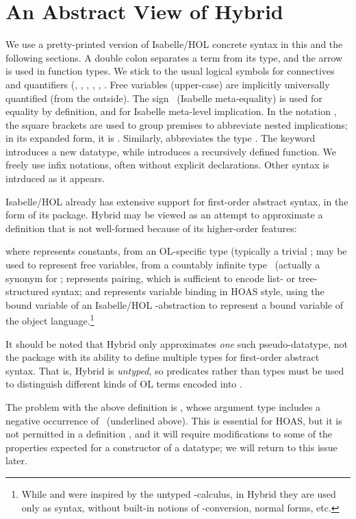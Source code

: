 \documentclass[copyright,creativecommons]{eptcs}
\begin{document}
\section{An Abstract View of Hybrid}
\label{sec:hybrid-overview}

We use a pretty-printed version of Isabelle\slash HOL concrete syntax
in this and the following sections.
A double colon  separates a term from its type, and the arrow
 is used in function types.
We stick to the usual logical symbols for connectives and quantifiers
(, , , , , .
Free variables (upper-case) are implicitly universally quantified
(from the outside).
The sign \ (Isabelle meta-equality) is used for equality by
definition, and  for Isabelle meta-level implication.
In the notation , the square
brackets are used to group premises to abbreviate nested implications;
in its expanded form, it is .
Similarly,  abbreviates the type
.
The keyword  introduces a new datatype, while
 introduces a recursively defined function.
We freely use infix notations, often without explicit declarations.
Other syntax is intrduced as it appears.

Isabelle\slash HOL already has extensive support for first-order abstract
syntax, in the form of its  package.  Hybrid may be viewed
as an attempt to approximate a  definition that is not
well-formed because of its higher-order features:
\begin{Display} \formal
\par\nopagebreak

\end{Display}
where  represents constants, from an OL-specific type 
(typically a trivial ;  may be used to represent
free variables, from a countably infinite type \ (actually
a synonym for ;  represents pairing, which is sufficient
to encode list- or tree-structured syntax; and  represents variable
binding in HOAS style, using the bound variable of an Isabelle\slash HOL
-abstraction to represent a bound variable of the object language.\footnote{While  and  were inspired by the untyped -calculus, in Hybrid they are used only as syntax, without built-in notions
    of -conversion, normal forms, etc.}

It should be noted that Hybrid only approximates \emph{one} such
pseudo-datatype, not the  package with its ability
to define multiple types for first-order abstract syntax.  That is,
Hybrid is \emph{untyped}, so predicates rather than types must be used
to distinguish different kinds of OL terms encoded into .

The problem with the above definition
is , whose argument type includes a negative occurrence
of \ (underlined above).  This is essential for HOAS, but it is not
permitted in a  definition
\cite[Sect.~2.6]{nipkow/paulson/wenzel:2011}, and it will require modifications
to some of the properties expected for a constructor of a datatype;
we will return to this issue later.
\end{document}
